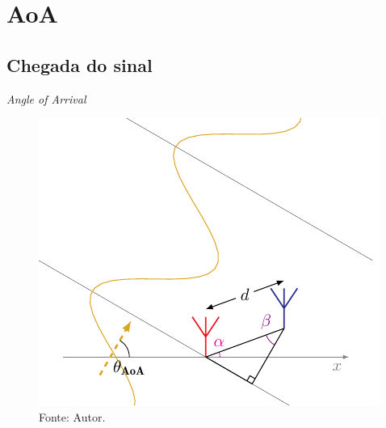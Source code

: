 \section{AoA}

    \subsection{Chegada do sinal}
    \begin{frame}{\textit{Angle of Arrival}}
        \begin{figure}
            \centering
            \caption*{$ \theta_\text{AoA} = \SI{60}{\degree} $, $\textcolor{cmyk_M}{\alpha_{k}}=\SI{20}{\degree}$, $ \textcolor{Purple}{\beta_{\pm k}} = \SI{40}{\degree} $}
            \includegraphics{../pictures/AoA_1}
            \caption*{ \tiny Fonte: Autor.}
        \end{figure}
    \end{frame}

